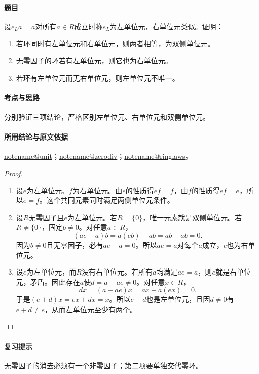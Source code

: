 \documentclass[UTF8,a4paper,11pt,fontset=windows]{ctexart}
\makeatletter
\newcommand{\noteref}[1]{\hyperref[note:#1]{\csname notename@#1\endcsname}}
\newcommand{\exref}[2]{\hyperref[ex:#1:#2]{第#1章习题#2}}
\makeatother
\begin{document}
\paragraph{题目}
设$e_La=a$对所有$a\in R$成立时称$e_L$为左单位元，右单位元类似。证明：
\begin{enumerate}
\item 若环同时有左单位元和右单位元，则两者相等，为双侧单位元。
\item 无零因子的环若有左单位元，则它也为右单位元。
\item 若环有左单位元而无右单位元，则左单位元不唯一。
\end{enumerate}

\paragraph{考点与思路}
分别验证三项结论，严格区别左单位元、右单位元和双侧单位元。

\paragraph{所用结论与原文依据}
\noteref{unit}；\noteref{zerodiv}；\noteref{ringlaws}。


\begin{proof}
\begin{enumerate}
\item 设$e$为左单位元、$f$为右单位元。由$e$的性质得$ef=f$，由$f$的性质得$ef=e$，所以$e=f$。这个共同元素同时满足两侧单位元条件。

\item 设$R$无零因子且$e$为左单位元。若$R=\{0\}$，唯一元素就是双侧单位元。若$R\ne\{0\}$，固定$b\ne0$。对任意$a\in R$，
\[
(ae-a)b=a(eb)-ab=ab-ab=0.
\]
因为$b\ne0$且无零因子，必有$ae-a=0$。所以$ae=a$对每个$a$成立，$e$也为右单位元。

\item 设$e$为左单位元，而$R$没有右单位元。若所有$a$均满足$ae=a$，则$e$就是右单位元，矛盾。因此存在$a$使$d=a-ae\ne0$。对任意$x\in R$，
\[
dx=(a-ae)x=ax-a(ex)=0.
\]
于是$(e+d)x=ex+dx=x$。所以$e+d$也是左单位元，且因$d\ne0$有$e+d\ne e$，从而左单位元至少有两个。
\end{enumerate}
\end{proof}

\paragraph{复习提示}
无零因子的消去必须有一个非零因子；第二项要单独交代零环。
\end{document}

